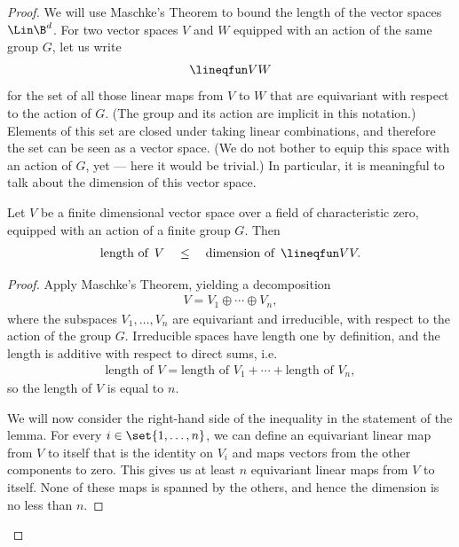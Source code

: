 \begin{proof}
    We will use Maschke's Theorem to bound the length of the vector  spaces $\Lin \B^d$. 
    For two vector spaces $V$ and $W$ equipped with an action of the same group $G$, let us write 
    \begin{align*}
    \lineqfun V W
    \end{align*}
    for the set of all those linear maps from $V$ to $W$ that are equivariant with respect to the action of $G$. 
    (The group and its action are  implicit in this notation.) 
    Elements of this set are closed under taking linear combinations, and therefore the set can be seen as a vector space. 
    (We do not bother to equip this space with an action of $G$, yet --- here it would be trivial.) 
    In particular, it is meaningful to talk about the dimension of this vector space. 
    \begin{lemma}\label{lem:dim-bounds-length}
        Let $V$ be a finite dimensional vector space over a field of characteristic zero, equipped with an action of a finite group $G$. Then 
        \begin{align*}
        \text{length of\, $V$} \quad \leq  \quad \text{dimension of\, }  \lineqfun V V.
        \end{align*}
    \end{lemma}
    \begin{proof}
        Apply Maschke's Theorem, yielding a decomposition 
        \begin{align*}
        V = V_1 \oplus \cdots \oplus V_n,
        \end{align*}
        where the subspaces $V_1,\ldots,V_n$ are equivariant and irreducible, with respect to the action of the group $G$. Irreducible spaces have length one by definition, and the length is additive with respect to direct sums, i.e.
        \begin{align*}
            \text{length of $V$} = \text{length of $V_1$} + \cdots + \text{length of $V_n$},
        \end{align*}
        so the length of $V$ is equal to $n$. 
        
        We will now consider the right-hand side of the inequality in the statement of the lemma.
        For every $i \in \set{1,\ldots,n}$, we can define an equivariant linear map from $V$ to itself that is the identity on $V_i$ and maps vectors from the other components to zero.  This gives us  at least $n$ equivariant linear maps from $V$ to itself. None of these maps is spanned by the others, and hence the dimension is no less than $n$. 
    \end{proof}


\end{proof}
